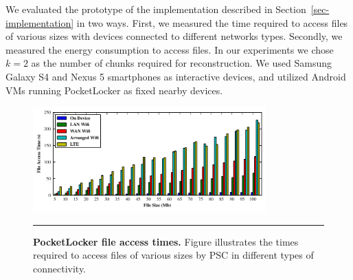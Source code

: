 We evaluated the prototype of the implementation described in
Section~\ref{sec-implementation} in two ways. First, we measured the time
required to access files of various sizes with devices connected to different
networks types. Secondly, we measured the energy consumption to access files.
In our experiments we chose $k=2$ as the number of chunks required for
reconstruction. We used Samsung Galaxy S4 and Nexus 5 smartphones as
interactive devices, and utilized Android VMs running PocketLocker as fixed
nearby devices.

\begin{figure}[t]
  \centering
  \includegraphics[width=0.8\textwidth]{./figures/downloadtimes.pdf}
  
  \vspace*{-0.1in}

  \caption{\small \textbf{PocketLocker file access times.} Figure
    illustrates the
    times required to access files of various sizes by PSC in different
    types of
  connectivity.}

  \label{fig-evaluation-download}
  
  \vspace*{0.05in}

  \hrule

  \vspace*{-0.2in}

\end{figure}


